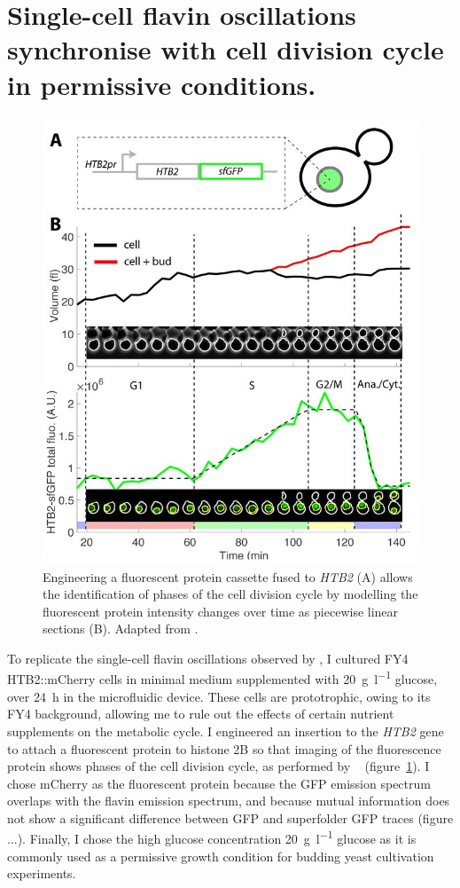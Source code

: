 \section[Permissive conditions]{Single-cell flavin oscillations synchronise with cell division cycle in permissive conditions.}
\label{sec:biology-sync}

\begin{figure}
  \centering
    \includegraphics[width=0.5\linewidth]{garmendia-torresMultipleInputsEnsure2018_1_adapted.jpg}
    \caption{
      Engineering a fluorescent protein cassette fused to \textit{HTB2} (A) allows the identification of phases of the cell division cycle by modelling the fluorescent protein intensity changes over time as piecewise linear sections (B).
      Adapted from \textcite{garmendia-torresMultipleInputsEnsure2018}.
    }
  \label{fig:biology-htb2}
\end{figure}

To replicate the single-cell flavin oscillations observed by \textcite{baumgartnerFlavinbasedMetabolicCycles2018}, I cultured FY4 HTB2::mCherry cells in minimal medium supplemented with \SI{20}{\gram~\litre^{-1}} glucose, over \SI{24}{\hour} in the microfluidic device.
These cells are prototrophic, owing to its FY4 background, allowing me to rule out the effects of certain nutrient supplements on the metabolic cycle.
I engineered an insertion to the \textit{HTB2} gene to attach a fluorescent protein to histone 2B so that imaging of the fluorescence protein shows phases of the cell division cycle, as performed by ~\textcite{garmendia-torresMultipleInputsEnsure2018} (figure~\ref{fig:biology-htb2}).
I chose mCherry as the fluorescent protein because the GFP emission spectrum overlaps with the flavin emission spectrum, and because mutual information does not show a significant difference between GFP and superfolder GFP traces (figure ...).
Finally, I chose the high glucose concentration \SI{20}{\gram~\litre^{-1}} glucose as it is commonly used as a permissive growth condition for budding yeast cultivation experiments.

